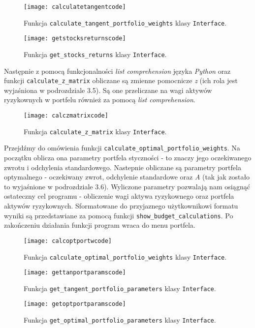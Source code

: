 \documentclass[magister]{dyplom}
\def\code#1{\texttt{#1}}
\begin{document}
\begin{figure}[ht!]
	\centering
	\texttt{[image: calculatetangentcode]}
	\caption{Funkcja \code{calculate\_tangent\_portfolio\_weights} klasy \code{Interface}.}
\end{figure}

\begin{figure}[ht!]
	\centering
	\texttt{[image: getstocksreturnscode]}
	\caption{Funkcja \code{get\_stocks\_returns} klasy \code{Interface}.}
\end{figure}
\newpage
Następnie z pomocą funkcjonalności \textit{list comprehension} języka \textit{Python}\cite{pythonlist} oraz funkcji \code{calculate\_z\_matrix} obliczane są zmienne pomocnicze \textit{z} (ich rola jest wyjaśniona w podrozdziale 3.5). Są one przeliczane na wagi aktywów ryzykownych w portfelu również za pomocą \textit{list comprehension}.

\begin{figure}[ht!]
	\centering
	\texttt{[image: calczmatrixcode]}
	\caption{Funkcja \code{calculate\_z\_matrix} klasy \code{Interface}.}
\end{figure}

Przejdźmy do omówienia funkcji \code{calculate\_optimal\_portfolio\_weights}. Na początku oblicza ona parametry portfela styczności - to znaczy jego oczekiwanego zwrotu i odchylenia standardowego. Nastepnie obliczane są parametry portfela optymalnego - oczekiwany zwrot, odchylenie standardowe oraz \textit{A} (tak jak zostało to wyjaśnione w podrozdziale 3.6). Wyliczone parametry pozwalają nam osiągnąć ostateczny cel programu - obliczenie wagi aktywa ryzykownego oraz portfela aktywów ryzykownych. Sformatowane do przyjaznego użytkownikowi formatu wyniki są przedstawiane za pomocą funkcji \code{show\_budget\_calculations}. Po zakończeniu działania funkcji program wraca do menu portfela.

\begin{figure}[ht!]
	\centering
	\texttt{[image: calcoptportwcode]}
	\caption{Funkcja \code{calculate\_optimal\_portfolio\_weights} klasy \code{Interface}.}
\end{figure}

\begin{figure}[ht!]
	\centering
	\texttt{[image: gettanportparamscode]}
	\caption{Funkcja \code{get\_tangent\_portfolio\_parameters} klasy \code{Interface}.}
\end{figure}

\begin{figure}[ht!]
	\centering
	\texttt{[image: getoptportparamscode]}
	\caption{Funkcja \code{get\_optimal\_portfolio\_parameters} klasy \code{Interface}.}
\end{figure}
\end{document}
